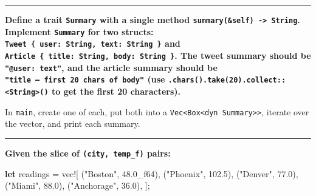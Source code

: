 \documentclass[
  11pt,
]{article}
\newenvironment{Shaded}{}{}
\newcommand{\DecValTok}[1]{\textcolor[rgb]{0.25,0.63,0.44}{#1}}
\newcommand{\KeywordTok}[1]{\textcolor[rgb]{0.00,0.44,0.13}{\textbf{#1}}}
\newcommand{\NormalTok}[1]{#1}
\newcommand{\OperatorTok}[1]{\textcolor[rgb]{0.40,0.40,0.40}{#1}}
\newcommand{\PreprocessorTok}[1]{\textcolor[rgb]{0.74,0.48,0.00}{#1}}
\newcommand{\StringTok}[1]{\textcolor[rgb]{0.25,0.44,0.63}{#1}}
\begin{document}
\begin{Shaded}
\begin{Highlighting}[]


\end{Highlighting}
\end{Shaded}

\begin{center}\rule{0.5\linewidth}{0.5pt}\end{center}

\textbf{Define a trait \texttt{Summary} with a single method
\texttt{summary(\&self)\ -\textgreater{}\ String}. Implement
\texttt{Summary} for two structs:
\texttt{Tweet\ \{\ user:\ String,\ text:\ String\ \}} and
\texttt{Article\ \{\ title:\ String,\ body:\ String\ \}}. The tweet
summary should be \texttt{"@user:\ text"}, and the article summary
should be \texttt{"title\ —\ first\ 20\ chars\ of\ body"} (use
\texttt{.chars().take(20).collect::\textless{}String\textgreater{}()} to
get the first 20 characters).}

In \texttt{main}, create one of each, put both into a
\texttt{Vec\textless{}Box\textless{}dyn\ Summary\textgreater{}\textgreater{}},
iterate over the vector, and print each summary.

\begin{Shaded}
\begin{Highlighting}[]


\end{Highlighting}
\end{Shaded}

\begin{center}\rule{0.5\linewidth}{0.5pt}\end{center}

\textbf{Given the slice of \texttt{(city,\ temp\_f)} pairs:}

\begin{Shaded}
\begin{Highlighting}[]
\KeywordTok{let}\NormalTok{ readings }\OperatorTok{=} \PreprocessorTok{vec!}\NormalTok{[}
\NormalTok{    (}\StringTok{"Boston"}\OperatorTok{,} \DecValTok{48.0\_f64}\NormalTok{)}\OperatorTok{,}\NormalTok{ (}\StringTok{"Phoenix"}\OperatorTok{,} \DecValTok{102.5}\NormalTok{)}\OperatorTok{,}
\NormalTok{    (}\StringTok{"Denver"}\OperatorTok{,} \DecValTok{77.0}\NormalTok{)}\OperatorTok{,}\NormalTok{ (}\StringTok{"Miami"}\OperatorTok{,} \DecValTok{88.0}\NormalTok{)}\OperatorTok{,}\NormalTok{ (}\StringTok{"Anchorage"}\OperatorTok{,} \DecValTok{36.0}\NormalTok{)}\OperatorTok{,}
\NormalTok{]}\OperatorTok{;}
\end{Highlighting}
\end{Shaded}
\end{document}
